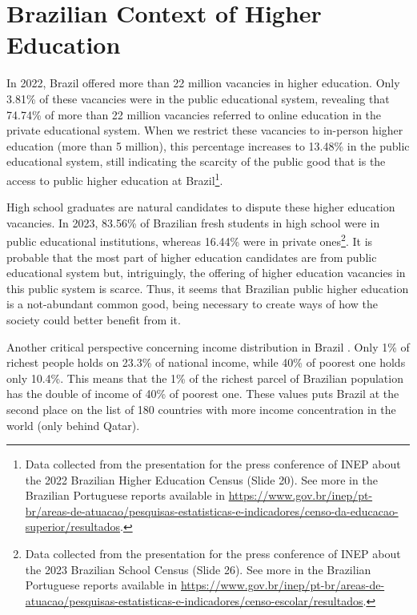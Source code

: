 \section{Brazilian Context of Higher Education}
\label{equity-sec:br-context}

In 2022, Brazil offered more than 22 million vacancies in higher education. Only 3.81\% of these vacancies were in the public educational system, revealing that 74.74\% of more than 22 million vacancies referred to online education in the private educational system. When we restrict these vacancies to in-person higher education (more than 5 million), this percentage increases to 13.48\% in the public educational system, still indicating the scarcity of the public good that is the access to public higher education at Brazil\footnote{Data collected from the presentation for the press conference of \gls{INEP} about the 2022 Brazilian Higher Education Census (Slide 20). See more in the Brazilian Portuguese reports available in \url{https://www.gov.br/inep/pt-br/areas-de-atuacao/pesquisas-estatisticas-e-indicadores/censo-da-educacao-superior/resultados}.}.

High school graduates are natural candidates to dispute these higher education vacancies. In 2023, 83.56\% of Brazilian fresh students in high school were in public educational institutions, whereas 16.44\% were in private ones\footnote{Data collected from the presentation for the press conference of \gls{INEP} about the 2023 Brazilian School Census (Slide 26). See more in the Brazilian Portuguese reports available in \url{https://www.gov.br/inep/pt-br/areas-de-atuacao/pesquisas-estatisticas-e-indicadores/censo-escolar/resultados}.}. It is probable that the most part of higher education candidates are from public educational system but, intriguingly, the offering of higher education vacancies in this public system is scarce. Thus, it seems that Brazilian public higher education is a not-abundant common good, being necessary to create ways of how the society could better benefit from it.

Another critical perspective concerning income distribution in Brazil \cite{sasse:2021}. Only 1\% of richest people holds on 23.3\% of national income, while 40\% of poorest one holds only 10.4\%. This means that the 1\% of  the richest parcel of Brazilian population has the double of income of 40\% of poorest one. These values puts Brazil at the second place on the list of 180 countries with more income concentration in the world (only behind Qatar).

